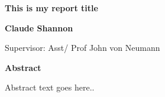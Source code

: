 \thispagestyle{plain}
\begin{center}
    \Large
    \textbf{This is my report title}
        
    \vspace{0.4cm}
    \textbf{Claude Shannon}
    
    \vspace{0.4cm}
    \large{Supervisor: Asst/ Prof John von Neumann  }
       
    \vspace{0.9cm}
    \textbf{Abstract}
\end{center}

Abstract text goes here.. 
